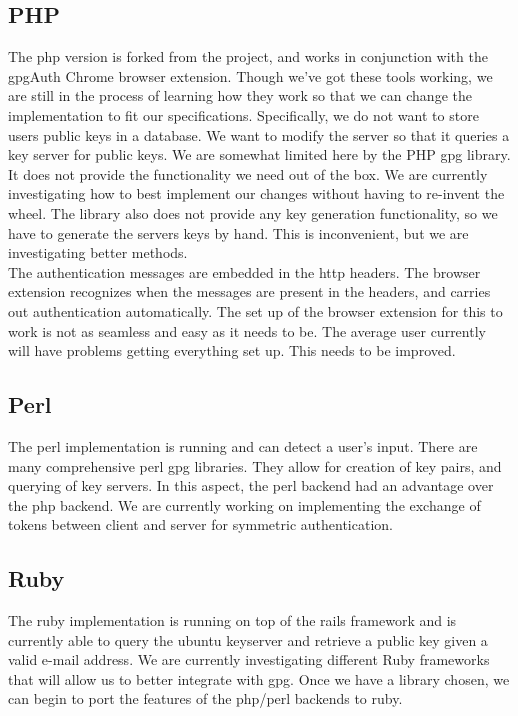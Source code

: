 \documentclass[11pt]{article}
\begin{document}
\subsection{PHP} \label{subsec:php}
The php version is forked from the  project, and works in conjunction with the gpgAuth Chrome browser extension.  Though we've got these tools working, we are still in the process of learning how they work so that we can change the implementation to fit our specifications. Specifically, we do not want to store users public keys in a database. We want to modify the server so that it queries a key server for public keys. We are somewhat limited here by the PHP gpg library. It does not provide the functionality we need out of the box. We are currently investigating how to best implement our changes without having to re-invent the wheel. The library also does not provide any key generation functionality, so we have to generate the servers keys by hand. This is inconvenient, but we are investigating better methods.\\
The authentication messages are embedded in the http headers. The browser extension recognizes when the messages are present in the headers, and carries out authentication automatically. The set up of the browser extension for this to work is not as seamless and easy as it needs to be. The average user currently will have problems getting everything set up. This needs to be improved.
\subsection{Perl} \label{subsec:perl}
The perl implementation is running and can detect a user's input. There are many comprehensive perl gpg libraries. They allow for creation of key pairs, and querying of key servers. In this aspect, the perl backend had an advantage over the php backend. We are currently working on implementing the exchange of tokens between client and server for symmetric authentication. 
\subsection{Ruby} \label{subsec:ruby}
The ruby implementation is running on top of the rails framework and is currently able to query the ubuntu keyserver and retrieve a public key given a valid e-mail address. We are currently investigating different Ruby frameworks that will allow us to better integrate with gpg. Once we have a library chosen, we can begin to port the features of the php/perl backends to ruby. 
\end{document}

